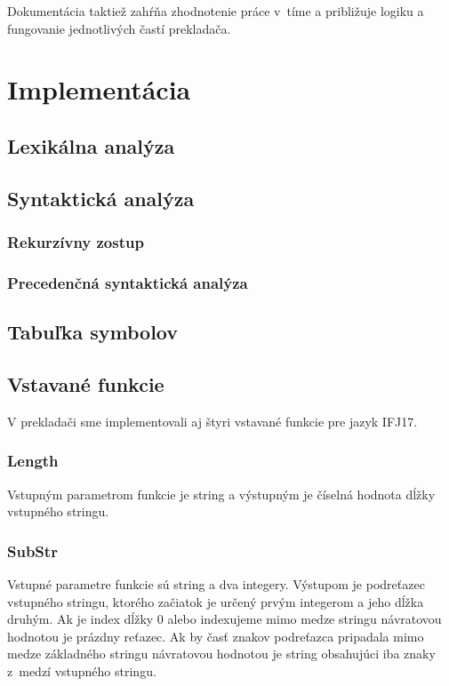 \documentclass{article}
\begin{document}
        Dokumentácia taktiež zahŕňa zhodnotenie práce v~tíme a približuje logiku a fungovanie
        jednotlivých častí prekladača. 
    
    \section{Implementácia}
    
        \subsection{Lexikálna analýza}
        
        \subsection{Syntaktická analýza}
            \subsubsection{Rekurzívny zostup}
            \subsubsection{Precedenčná syntaktická analýza}
    
        \subsection{Tabuľka symbolov}
        
        \subsection{Vstavané funkcie}
            V prekladači sme implementovali aj štyri vstavané funkcie pre jazyk IFJ17.
            
            \subsubsection{Length}
            Vstupným parametrom funkcie je string a výstupným je číselná hodnota dĺžky vstupného stringu.
            
            \subsubsection{SubStr}
            Vstupné parametre funkcie sú string  a dva integery. Výstupom je podreťazec vstupného
            stringu, ktorého začiatok je určený prvým integerom a jeho dĺžka druhým. Ak je index dĺžky
            0 alebo indexujeme mimo medze stringu návratovou hodnotou je prázdny reťazec. Ak by časť 
            znakov podreťazca pripadala mimo medze základného stringu návratovou hodnotou je string
            obsahujúci iba znaky z~medzí vstupného stringu.
            
\end{document}
